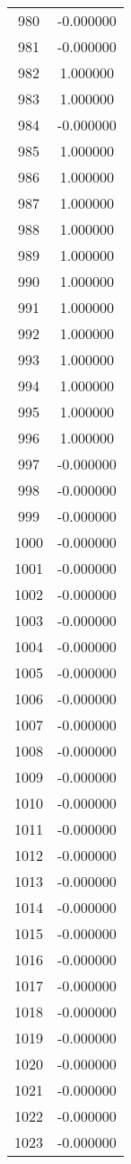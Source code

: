 \documentclass[12pt]{article}
\begin{document}
\begin{longtable}{@{}cc@{}}
980 & -0.000000 \\
981 & -0.000000 \\
982 & 1.000000 \\
983 & 1.000000 \\
984 & -0.000000 \\
985 & 1.000000 \\
986 & 1.000000 \\
987 & 1.000000 \\
988 & 1.000000 \\
989 & 1.000000 \\
990 & 1.000000 \\
991 & 1.000000 \\
992 & 1.000000 \\
993 & 1.000000 \\
994 & 1.000000 \\
995 & 1.000000 \\
996 & 1.000000 \\
997 & -0.000000 \\
998 & -0.000000 \\
999 & -0.000000 \\
1000 & -0.000000 \\
1001 & -0.000000 \\
1002 & -0.000000 \\
1003 & -0.000000 \\
1004 & -0.000000 \\
1005 & -0.000000 \\
1006 & -0.000000 \\
1007 & -0.000000 \\
1008 & -0.000000 \\
1009 & -0.000000 \\
1010 & -0.000000 \\
1011 & -0.000000 \\
1012 & -0.000000 \\
1013 & -0.000000 \\
1014 & -0.000000 \\
1015 & -0.000000 \\
1016 & -0.000000 \\
1017 & -0.000000 \\
1018 & -0.000000 \\
1019 & -0.000000 \\
1020 & -0.000000 \\
1021 & -0.000000 \\
1022 & -0.000000 \\
1023 & -0.000000 \\

\end{longtable}
\end{document}
